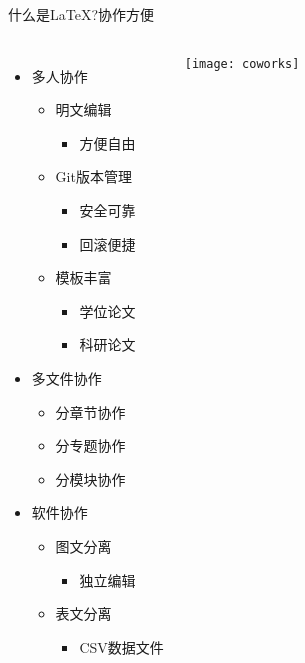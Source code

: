 \documentclass[xcolor=svgnames, t, 10pt]{ctexbeamer}%
\begin{document}
\begin{frame}[t]{什么是\LaTeX?}{协作方便}
  \begin{columns}[c]
  \stretchon
  \begin{itemize}
  \item \alert{多人}协作
    \begin{itemize}
    \item 明文编辑
      \begin{itemize}
      \item 方便自由
      \end{itemize}
    \item Git版本管理
      \begin{itemize}
      \item 安全可靠
      \item 回滚便捷
      \end{itemize}
    \item 模板丰富
      \begin{itemize}
      \item 学位论文
      \item 科研论文
      \end{itemize}
    \end{itemize}
  \item \alert{多文件}协作
    \begin{itemize}
    \item 分章节协作
    \item 分专题协作
    \item 分模块协作
    \end{itemize}
  \item \alert{软件}协作
    \begin{itemize}
    \item 图文分离
      \begin{itemize}
      \item 独立编辑
      \end{itemize}
    \item 表文分离
      \begin{itemize}
      \item CSV数据文件
      \end{itemize}
    \end{itemize}
  \end{itemize}
  \begin{center}
    \texttt{[image: coworks]}
  \end{center}
\end{columns}
\end{frame}
\end{document}
